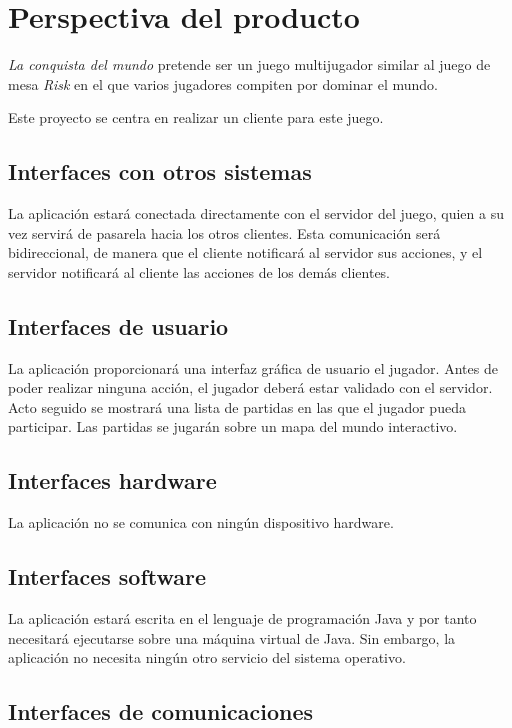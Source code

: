 \section{Perspectiva del producto}

\textit{La conquista del mundo} pretende ser un juego multijugador similar al
juego de mesa \textit{Risk} en el que varios jugadores compiten por dominar el
mundo.

Este proyecto se centra en realizar un cliente para este juego.

\subsection{Interfaces con otros sistemas}

La aplicación estará conectada directamente con el servidor del juego, quien a
su vez servirá de pasarela hacia los otros clientes. Esta comunicación será
bidireccional, de manera que el cliente notificará al servidor sus acciones, y
el servidor notificará al cliente las acciones de los demás clientes.

\subsection{Interfaces de usuario}

La aplicación proporcionará una interfaz gráfica de usuario el jugador. Antes
de poder realizar ninguna acción, el jugador deberá estar validado con el
servidor. Acto seguido se mostrará una lista de partidas en las que el jugador
pueda participar. Las partidas se jugarán sobre un mapa del mundo interactivo.

\subsection{Interfaces hardware}

La aplicación no se comunica con ningún dispositivo hardware.

\subsection{Interfaces software}

La aplicación estará escrita en el lenguaje de programación Java y por tanto
necesitará ejecutarse sobre una máquina virtual de Java. Sin embargo, la
aplicación no necesita ningún otro servicio del sistema operativo.

\subsection{Interfaces de comunicaciones}

